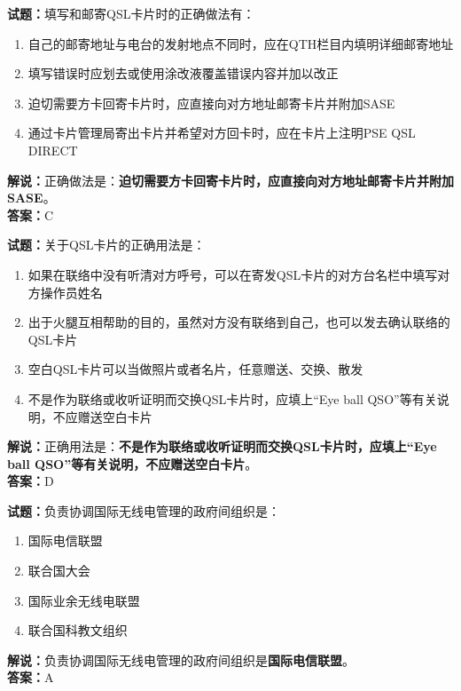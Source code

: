 \documentclass{ctexbook}
\begin{document}
\bigskip




\noindent\textbf{试题：}填写和邮寄QSL卡片时的正确做法有：
\begin{enumerate}[leftmargin=3em]
\item 自己的邮寄地址与电台的发射地点不同时，应在QTH栏目内填明详细邮寄地址
\item 填写错误时应划去或使用涂改液覆盖错误内容并加以改正
\item 迫切需要方卡回寄卡片时，应直接向对方地址邮寄卡片并附加SASE
\item 通过卡片管理局寄出卡片并希望对方回卡时，应在卡片上注明PSE QSL DIRECT
\end{enumerate}
\noindent\textbf{解说：}正确做法是：\textbf{迫切需要方卡回寄卡片时，应直接向对方地址邮寄卡片并附加SASE}。\\\noindent\textbf{答案：}C

\bigskip




\noindent\textbf{试题：}关于QSL卡片的正确用法是：
\begin{enumerate}[leftmargin=3em]
\item 如果在联络中没有听清对方呼号，可以在寄发QSL卡片的对方台名栏中填写对方操作员姓名
\item 出于火腿互相帮助的目的，虽然对方没有联络到自己，也可以发去确认联络的QSL卡片
\item 空白QSL卡片可以当做照片或者名片，任意赠送、交换、散发
\item 不是作为联络或收听证明而交换QSL卡片时，应填上“Eye ball QSO”等有关说明，不应赠送空白卡片
\end{enumerate}
\noindent\textbf{解说：}正确用法是：\textbf{不是作为联络或收听证明而交换QSL卡片时，应填上“Eye ball QSO”等有关说明，不应赠送空白卡片}。\\\noindent\textbf{答案：}D

\bigskip




\noindent\textbf{试题：}负责协调国际无线电管理的政府间组织是：
\begin{enumerate}[leftmargin=3em]
\item 国际电信联盟
\item 联合国大会
\item 国际业余无线电联盟
\item 联合国科教文组织
\end{enumerate}
\noindent\textbf{解说：}负责协调国际无线电管理的政府间组织是\textbf{国际电信联盟}。\\\noindent\textbf{答案：}A
\end{document}

